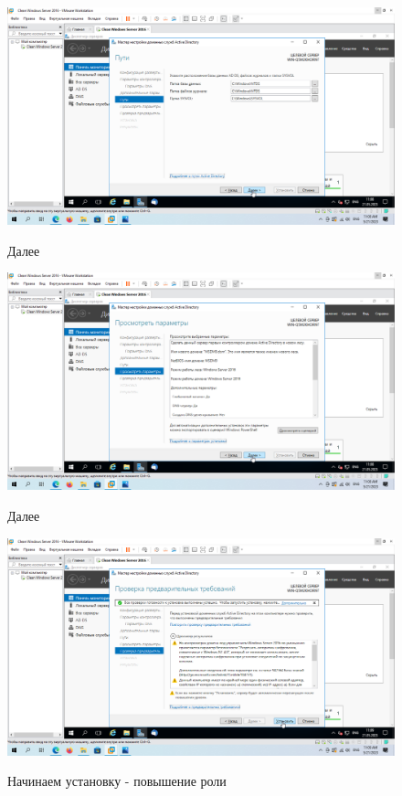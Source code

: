 \documentclass[a4paper]{article}
\begin{document}
  \begin{figure}[H]
    \centering
    \includegraphics[width=\textwidth]{11_0040}
    \label{img:40}
    \caption{Далее}
  \end{figure}

  \begin{figure}[H]
    \centering
    \includegraphics[width=\textwidth]{11_0041}
    \label{img:41}
    \caption{Далее}
  \end{figure}

  \begin{figure}[H]
    \centering
    \includegraphics[width=\textwidth]{11_0042}
    \label{img:42}
    \caption{Начинаем установку - повышение роли}
  \end{figure}
\end{document}
